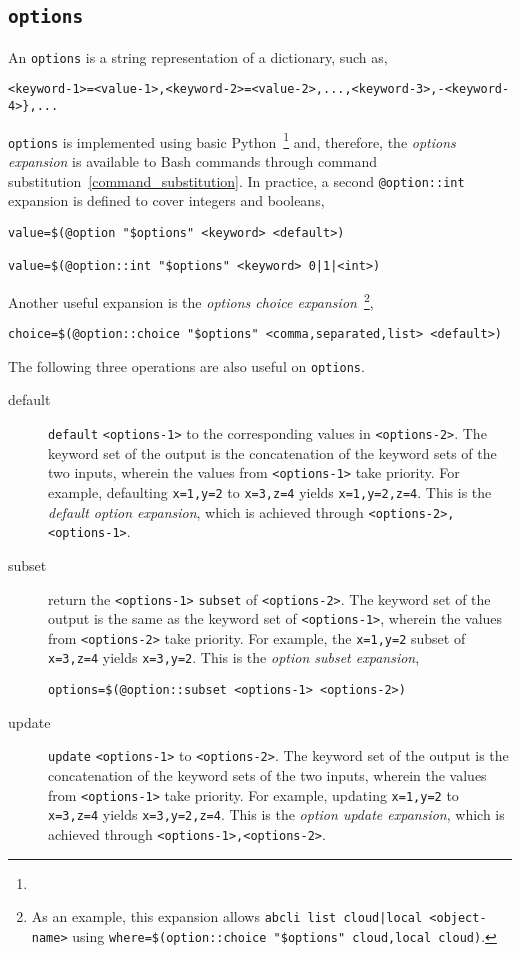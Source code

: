 \subsection{\texttt{options}}
\label{options}

An \texttt{options} is a string representation of a dictionary, such as,
%
\begin{verbatim}
<keyword-1>=<value-1>,<keyword-2>=<value-2>,...,<keyword-3>,-<keyword-4>},...
\end{verbatim}
%
\texttt{options} is implemented using basic Python~\footnote{} and, therefore, the \emph{options expansion} is available to Bash commands through command substitution~\ref{command_substitution}. In practice, a second \texttt{@option::int} expansion is defined to cover integers and booleans,
%
\begin{verbatim}
value=$(@option "$options" <keyword> <default>)

value=$(@option::int "$options" <keyword> 0|1|<int>)
\end{verbatim}
%
Another useful expansion is the \emph{options choice expansion}~\footnote{
As an example, this expansion allows \texttt{abcli list cloud|local <object-name>} using \texttt{where=\$(option::choice "\$options" cloud,local cloud)}.
},
%
\begin{verbatim}
choice=$(@option::choice "$options" <comma,separated,list> <default>)
\end{verbatim}
%
The following three operations are also useful on \texttt{options}.
%
\begin{description}
%
\item[default]{\texttt{default} \texttt{<options-1>} to the corresponding values in \texttt{<options-2>}. The keyword set of the output is the concatenation of the keyword sets of the two inputs, wherein the values from \texttt{<options-1>} take priority. For example, defaulting \texttt{x=1,y=2} to \texttt{x=3,z=4} yields \texttt{x=1,y=2,z=4}. This is the \emph{default option expansion}, which is achieved through \texttt{<options-2>,<options-1>}.}
%
\item[subset]{return the \texttt{<options-1>} \texttt{subset} of \texttt{<options-2>}. The keyword set of the output is the same as the keyword set of \texttt{<options-1>}, wherein the values from \texttt{<options-2>} take priority. For example, the \texttt{x=1,y=2} subset of \texttt{x=3,z=4} yields \texttt{x=3,y=2}. This is the \emph{option subset expansion},
\begin{verbatim}
options=$(@option::subset <options-1> <options-2>)
\end{verbatim}
}
%
\item[update]{\texttt{update} \texttt{<options-1>} to \texttt{<options-2>}. The keyword set of the output is the concatenation of the keyword sets of the two inputs, wherein the values from \texttt{<options-1>} take priority. For example, updating \texttt{x=1,y=2} to \texttt{x=3,z=4} yields \texttt{x=3,y=2,z=4}. This is the \emph{option update expansion}, which is achieved through \texttt{<options-1>,<options-2>}.}
%
\end{description}
